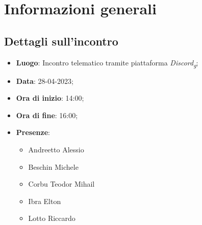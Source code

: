 \section{Informazioni generali}

\subsection{Dettagli sull'incontro}
\begin{itemize}
\item \textbf{Luogo}: Incontro telematico tramite piattaforma \textit{Discord\textsubscript{g}};
\item \textbf{Data}: 28-04-2023;
\item \textbf{Ora di inizio}: 14:00;
\item \textbf{Ora di fine}: 16:00;
\item \textbf{Presenze}: 
\begin{itemize}
	\item Andreetto Alessio
    \item Beschin Michele
    \item Corbu Teodor Mihail
    \item Ibra Elton
    \item Lotto Riccardo
\end{itemize}
\end{itemize}



